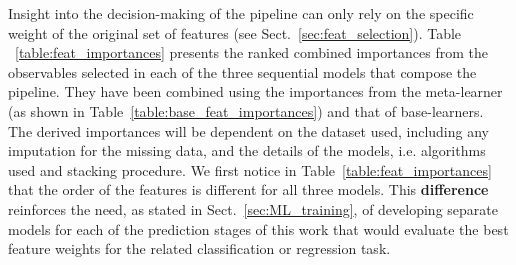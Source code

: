 \documentclass{aa}
\begin{document}
Insight into the decision-making of the pipeline can only rely on the specific weight of the original set of features (see Sect.~\ref{sec:feat_selection}). Table ~\ref{table:feat_importances} presents the ranked combined importances from the observables selected in each of the three sequential models that compose the pipeline. They have been combined using the importances from the meta-learner (as shown in Table~\ref{table:base_feat_importances}) and that of base-learners. The derived importances will be dependent on the dataset used, including any imputation for the missing data, and the details of the models, i.e. algorithms used and stacking procedure. 
We first notice in Table~\ref{table:feat_importances} that the order of the features is different for all three models. This \textbf{difference} reinforces the need, as stated in Sect.~\ref{sec:ML_training}, of developing separate models for each of the prediction stages of this work that would evaluate the best feature weights for the related classification or regression task. 
\end{document}
